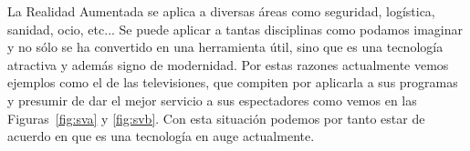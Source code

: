 \begin{figure}[htb]
    \centering
\end{figure}


La Realidad Aumentada se aplica a diversas áreas como seguridad, logística, sanidad, ocio, etc...
 Se puede aplicar a tantas disciplinas como podamos imaginar y no sólo se ha convertido en una herramienta útil, sino que es una tecnología atractiva
 y además signo de modernidad. Por estas razones actualmente vemos ejemplos como el de las televisiones, que compiten por aplicarla a sus programas
 y presumir de dar el mejor servicio a sus espectadores como vemos en las Figuras~\ref{fig:sva} y \ref{fig:svb}. Con esta situación podemos por tanto estar de acuerdo
 en que es una tecnología en auge actualmente. 


